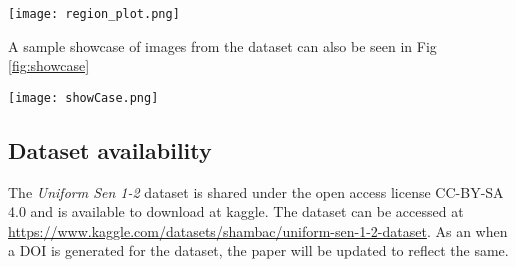 \begin{figure*}
    \texttt{[image: region\_plot.png]}
    \caption{All regions from where data has been included in the dataset}
    \label{fig:map}
\end{figure*}

A sample showcase of images from the dataset can also be seen in Fig \ref{fig:showcase}

\begin{figure*}
    \texttt{[image: showCase.png]}
    \caption{Sample images from the dataset. Top row: Sentinel-1 images, bottom row: corresponding Sentinel-2 images}
    \label{fig:showcase}
\end{figure*}

\subsection{Dataset availability}
The \textit{Uniform Sen 1-2} dataset is shared under the open access license CC-BY-SA 4.0 and is available to download at kaggle. The dataset can be accessed at \url{https://www.kaggle.com/datasets/shambac/uniform-sen-1-2-dataset}. As an when a DOI is generated for the dataset, the paper will be updated to reflect the same.